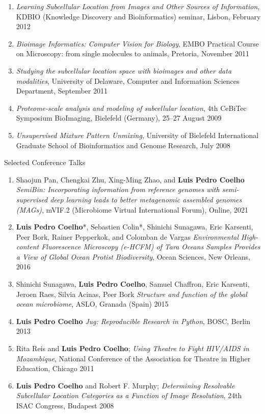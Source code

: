 \documentclass{article}
\renewcommand\subsection[1]{%
    \par\vspace{.1em}%
    {\hspace{0em}\subsubhead #1}%
    \par\vspace{.4em}%
}
\begin{document}
\begin{enumerate}
{Information}, EAO Seminar (Instituto Gulbenkian da Ciência), Oeiras, March 2012
\item \emph{Learning Subcellular Location from Images and Other Sources of
Information}, KDBIO (Knowledge Discovery and Bioinformatics) seminar, Lisbon,
February 2012
\item \emph{Bioimage Informatics: Computer Vision for Biology}, EMBO Practical
Course on Microscopy: from single molecules to animals, Pretoria, November 2011
\item \emph{Studying the subcellular location space with bioimages and other
data modalities}, University of Delaware, Computer and Information Sciences
Department, September 2011
\item \emph{Proteome-scale analysis and modeling of subcellular location}, 4th
CeBiTec Symposium BioImaging, Bielefeld (Germany), 25--27 August 2009
\item \emph{Unsupervised Mixture Pattern Unmixing}, University of Bielefeld
International Graduate School of Bioinformatics and Genome Research, July 2008
\end{enumerate}

\subsection{Selected Conference Talks}

\begin{enumerate}
\item Shaojun Pan, Chengkai Zhu, Xing-Ming Zhao, and \textbf{Luis Pedro
Coelho} \emph{SemiBin: Incorporating information from reference genomes with
semi-supervised deep learning leads to better metagenomic assembled genomes
(MAGs)}, mVIF.2 (Microbiome Virtual International Forum), Online, 2021
\item \textbf{Luis Pedro Coelho}*, Sebastien Colin*, Shinichi Sunagawa, Eric
Karsenti, Peer Bork, Rainer Pepperkok, and Colomban de Vargas
\emph{Environmental High-content Fluorescence Microscopy (e-HCFM) of Tara
Oceans Samples Provides a View of Global Ocean Protist Biodiversity}, Ocean
Sciences, New Orleans, 2016
\item Shinichi Sunagawa, \textbf{Luis Pedro Coelho}, Samuel Chaffron, Eric
Karsenti, Jeroen Raes, Silvia Acinas, Peer Bork \emph{Structure and function of
the global ocean microbiome}, ASLO, Granada (Spain) 2015
\item \textbf{Luis Pedro Coelho} \emph{Jug: Reproducible Research in Python},
BOSC, Berlin 2013
\item Rita Reis and \textbf{Luis Pedro Coelho}; \emph{Using Theatre to Fight
HIV/AIDS in Mozambique}, National Conference of the Association for Theatre in
Higher Education, Chicago 2011
\item \textbf{Luis Pedro Coelho} and Robert F. Murphy; \emph{Determining
Resolvable Subcellular Location Categories as a Function of Image Resolution},
24th ISAC Congress, Budapest 2008
\end{enumerate}
\end{document}
